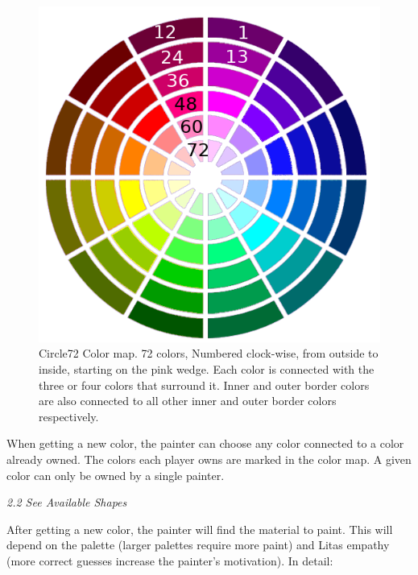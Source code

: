 \documentclass[twocolumn]{article}
\newcommand{\sublvl}[1]{\vspace{0.3cm}\Large{\textit{#1}}\vspace{0.1cm}}
\begin{document}
\begin{figure}[b!]
\centering
\includegraphics[scale=0.65]{map_1_numbered.png}
\caption{Circle72 Color map. 72 colors, Numbered clock-wise, from outside to inside, starting on the pink wedge. Each color is connected with the three or four colors that surround it. Inner and outer border colors are also connected to all other inner and outer border colors respectively.}
\label{fig:color_map}
\end{figure}

When getting a new color, the painter can choose any color connected to a color already owned. The colors each player owns are marked in the color map. A given color can only be owned by a single painter.

\sublvl{2.2 See Available Shapes}

After getting a new color, the painter will find the material to paint. This will depend on the palette (larger palettes require more paint) and Litas empathy (more correct guesses increase the painter's motivation). In detail: 
\end{document}
